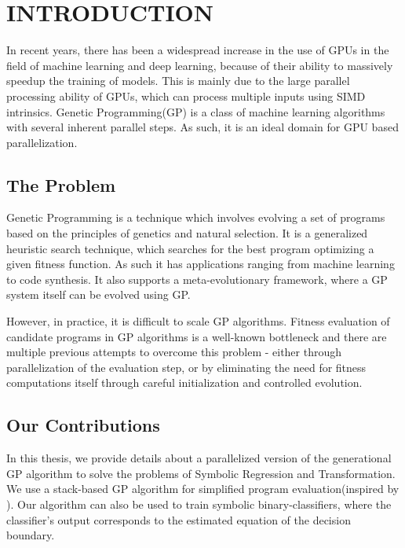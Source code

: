 \chapter{INTRODUCTION} \label{chap:intro}
In recent years, there has been a widespread increase in the use of GPUs in the field of machine learning and deep learning, because of their ability to massively speedup the training of models. This is mainly due to the large parallel processing ability of GPUs, which can process multiple inputs using SIMD intrinsics. Genetic Programming(GP) is a class of machine learning algorithms with several inherent parallel steps. As such, it is an ideal domain for GPU based parallelization. 

\section{The Problem}
\label{intro:problem}
Genetic  Programming is a technique which involves evolving a set of programs based on the principles of genetics and natural selection. It is a generalized heuristic search technique, which searches for the best program optimizing a given fitness function. 
As such it has applications ranging from machine learning to code synthesis\citep{Koza92}. It also supports a meta-evolutionary framework, where a GP system itself can be evolved using GP\citep{schaul2010metalearning}.

However, in practice, it is difficult to scale GP algorithms. Fitness evaluation of candidate programs in GP algorithms is a well-known bottleneck and there are multiple previous attempts to overcome this problem - either through parallelization of the evaluation step\citep{10.1007/978-3-540-71605-1_9,baeta2021tensorgp,DEAP_JMLR2012,gplearn,staats2017tensorflow}, or by eliminating the need for fitness computations itself through careful initialization and controlled evolution\citep{biles2001autonomous}.

\section{Our Contributions}
\label{intro:contrib} 
In this thesis, we provide details about a parallelized version of the generational GP algorithm to solve the problems of Symbolic Regression and Transformation. We use a stack-based GP algorithm for simplified program evaluation(inspired by \citep{perkis}). Our algorithm can also be used to train symbolic binary-classifiers, where the classifier's output corresponds to the estimated equation of the decision boundary. 

